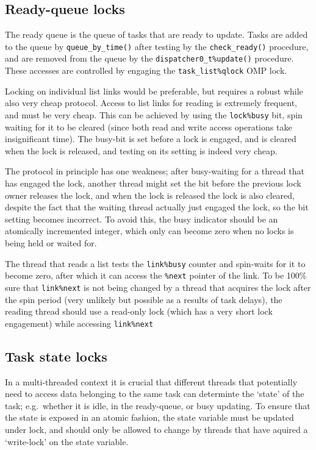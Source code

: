\documentclass[paper=a4,fontsize=11pt]{scrartcl}
\numberwithin{equation}{section}		%
\numberwithin{figure}{section}			%
\numberwithin{table}{section}				%
\newcommand{\codecolor}{\color{Blue}}
\newcommand{\Code}[1]{{\codecolor\texttt{#1}}}
\def\eg{e.g.\ }
\begin{document}
\subsection{Ready-queue locks}
The ready queue is the queue of tasks that are ready to update.  Tasks are added to the queue by \Code{queue\_by\_time()} after testing by the \Code{check\_ready()} procedure, and are removed from the queue by the \Code{dispatcher0\_t\%update()} procedure.  These accesses are controlled by engaging the \Code{task\_list\%qlock} OMP lock.

Locking on individual list links would be preferable, but requires a robust while also very cheap protocol.  Access to list links for reading is extremely frequent, and must be very cheap.  This can be achieved by using the \Code{lock\%busy} bit, spin waiting for it to be cleared (since both read and write access operations take insignificant time).  The busy-bit is set before a lock is engaged, and is cleared when the lock is released, and testing on its setting is indeed very cheap.

The protocol in principle has one weakness; after busy-waiting for a thread that has engaged the lock, another thread might set the bit before the previous lock owner releases the lock, and when the lock is released the lock is also cleared, despite the fact that the waiting thread actually just engaged the lock, so the bit setting becomes incorrect.  To avoid this, the busy indicator should be an atomically incremented integer, which only can become zero when no locks is being held or waited for.

The thread that reads a list tests the \Code{link\%busy} counter and spin-waits for it to become zero, after which it can access the \Code{\%next} pointer of the link.  To be 100\% sure that \Code{link\%next} is not being changed by a thread that acquires the lock after the spin period (very unlikely but possible as a results of task delays), the reading thread should use a read-only lock (which has a very short lock engagement) while accessing \Code{link\%next}

\subsection{Task state locks}
In a multi-threaded context it is crucial that different threads that potentially need to access data belonging to the same task can determinte the `state' of the task; \eg whether it is idle, in the ready-queue, or busy updating.  To ensure that the state is exposed in an atomic fashion, the state variable must be updated under lock, and should only be allowed to change by threads that have aquired a `write-lock' on the state variable.
\end{document}
